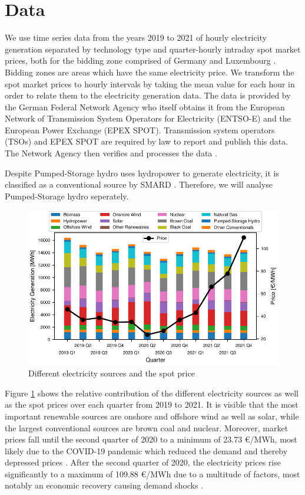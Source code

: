 \documentclass{article}
\begin{document}
\section{Data}
We use time series data from the years 2019 to 2021 of hourly electricity generation separated by technology type and quarter-hourly intraday spot market prices, both for the bidding zone comprised of Germany and Luxembourg \citep{smard}.
Bidding zones are areas which have the same electricity price.
We transform the spot market prices to hourly intervals by taking the mean value for each hour in order to relate them to the electricity generation data.
The data is provided by the German Federal Network Agency who itself obtains it from the European Network of Transmission System Operators for Electricity (ENTSO-E) and the European Power Exchange (EPEX SPOT).
Transmission system operators (TSOs) and EPEX SPOT are required by law to report and publish this data.
The Network Agency then verifies and processes the data \citep{smard_usermanual}.

Despite Pumped-Storage hydro uses hydropower to generate electricity, it is classified as a conventional source by SMARD \citep{smard_usermanual}. Therefore, we will analyse Pumped-Storage hydro seperately.  

\begin{figure}[h]
    \centering
    \includegraphics[width=0.8\columnwidth]{doc/fig/quarterly_technology_mix_with_price.pdf}
    \caption{Different electricity sources and the spot price}
    \label{fig:quarterly_mix}
\end{figure}

Figure \ref{fig:quarterly_mix} shows the relative contribution of the different electricity sources as well as the spot prices over each quarter from 2019 to 2021.
It is visible that the most important renewable sources are onshore and offshore wind as well as solar, while the largest conventional sources are brown coal and nuclear.
Moreover, market prices fall until the second quarter of 2020 to a minimum of 23.73 €/MWh, most likely due to the COVID-19 pandemic which reduced the demand and thereby depressed prices \citep{covid_electricity_systems}.
After the second quarter of 2020, the electricity prices rise significantly to a maximum of 109.88 €/MWh due to a multitude of factors, most notably an economic recovery causing demand shocks \citep{long_covid_energy_prices}.
\end{document}
